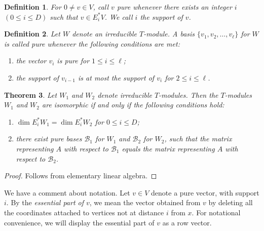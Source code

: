 \documentclass[12pt,letterpaper]{article}
\newtheorem{theorem}{Theorem}
\newtheorem{definition}[theorem]{Definition}
\begin{document}
\begin{definition}\rm For $0 \ne v \in V$, call $v$ \textit{pure} whenever there exists an integer $i$\, $(0 \le i \le D)$ such that $v \in E_i^*V$. We call $i$ the {\it support} of $v$.
\end{definition} 

\begin{definition} \rm
 Let $W$ denote an irreducible $T$-module. A basis $\lbrace v_1, v_2, \ldots, v_\ell \rbrace$ for $W$ is called {\it pure} whenever
the following conditions are met:
\begin{enumerate}
\item[\rm (i)] the vector $v_i$ is pure for $1 \leq i \leq \ell$; 
\item[\rm (ii)] the support of $v_{i-1}$ is at most the support of $v_i$ for $2 \leq i\leq \ell$.
\end{enumerate}
\end{definition} 


\begin{theorem}\label{thm:isom}
Let $W_1$ and $W_2$ denote irreducible $T$-modules. Then the $T$-modules $W_1$ and $W_2$ are isomorphic if and only if the following conditions hold:
\begin{enumerate}
  \item[\rm(i)] $\dim E_i^* W_1 = \dim E_i^* W_2$ for $0\le i\le D$; 
  
  \item[\rm(ii)] there exist pure bases $\mathcal{B}_1$ for $W_1$ and $\mathcal{B}_2$ for $W_2$, such that the matrix representing $A$ with respect to $\mathcal{B}_1$ equals the matrix representing $A$ with respect to $\mathcal{B}_2$.
\end{enumerate}
\end{theorem}
\begin{proof}
Follows from elementary linear algebra.
\end{proof}

We have a comment about notation. Let $v \in V$ denote a pure vector, with support $i$. By the \textit{essential part of $v$}, we mean the vector obtained from $v$ by deleting all the coordinates attached to vertices not at distance $i$ from $x$. For notational convenience, we will display the essential part of $v$ as a row vector.
\end{document}
